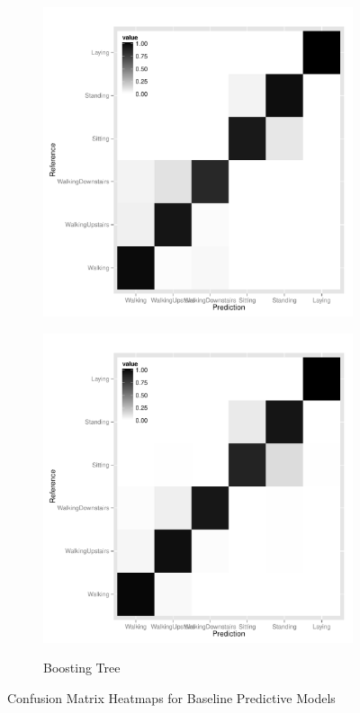 \begin{appendices}
\begin{landscape}
\begin{figure}
\begin{subfigure}[b]{0.45\textwidth}
    \includegraphics[width=\textwidth]{heatmap_rf.pdf}
    \label{fig:heatmap_rf}
  \end{subfigure}
  \begin{subfigure}[b]{0.45\textwidth}
    \caption{Boosting Tree}
    \includegraphics[width=\textwidth]{heatmap_boost.pdf}
    \label{fig:heatmap_boost}
  \end{subfigure}
  \caption{Confusion Matrix Heatmaps for Baseline Predictive Models}
\end{figure}
\end{landscape}


\end{appendices}
